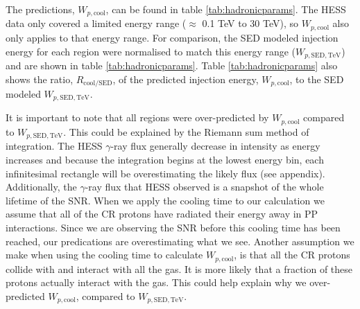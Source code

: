 \documentclass[12pt,a4paper]{article}
\begin{document}
The predictions, $W_{p,\mathrm{cool}}$, can be found in table \ref{tab:hadronicparams}. The HESS data only covered a limited energy range ($\approx$ 0.1 TeV to 30 TeV), so $W_{p,\mathrm{cool}}$ also only applies to that energy range. For comparison, the SED modeled injection energy for each region were normalised to match this energy range ($W_{p, \mathrm{SED}, \mathrm{TeV}}$) and are shown in table \ref{tab:hadronicparams}. Table \ref{tab:hadronicparams} also shows the ratio, $R_{\mathrm{cool/SED}}$, of the predicted injection energy, $W_{p, \mathrm{cool}}$, to the SED modeled $W_{p,\mathrm{SED}, \mathrm{TeV}}$.

It is important to note that all regions were over-predicted by $W_{p, \mathrm{cool}}$ compared to $W_{p, \mathrm{SED}, \mathrm{TeV}}$. This could be explained by the Riemann sum method of integration. The HESS $\gamma$-ray flux generally decrease in intensity as energy increases and because the integration begins at the lowest energy bin, each infinitesimal rectangle will be overestimating the likely flux (see appendix). Additionally, the $\gamma$-ray flux that HESS observed is a snapshot of the whole lifetime of the SNR. When we apply the cooling time to our calculation we assume that all of the CR protons have radiated their energy away in PP interactions. Since we are observing the SNR before this cooling time has been reached, our predications are overestimating what we see. Another assumption we make when using the cooling time to calculate $W_{p,\mathrm{cool}}$, is that all the CR protons collide with and interact with all the gas. It is more likely that a fraction of these protons actually interact with the gas. This could help explain why we over-predicted $W_{p,\mathrm{cool}}$, compared to $W_{p,\mathrm{SED}, \mathrm{TeV}}$. 
\end{document}
